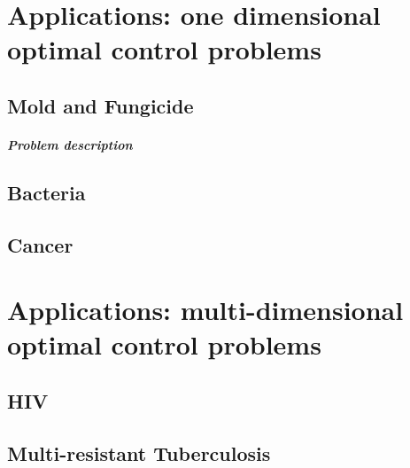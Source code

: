 \documentclass[12pt,oneside]{Thesis}
\begin{document}
	\frontmatter 
	\fancyhead{} 
	\rhead{\thepage} 
	\lhead{} 
	\pagestyle{fancy} 
	\newcommand{\HRule}{\rule{\linewidth}{0.5mm}} 
	\hypersetup{pdfauthor=\autor}
	
	
	
	
	\mainmatter 
	\pagestyle{fancy} 

  
   \chapter{Applications: one dimensional optimal control problems}
      \section{Mold and Fungicide}
      	\paragraph{Problem description}
       \section{Bacteria}
       \section{Cancer}
    \chapter{Applications: multi-dimensional optimal control problems}
    	\section{HIV}
        \section{Multi-resistant Tuberculosis}
	\nocite{*}
    \label{Bibliography}
	 
      
\end{document}
